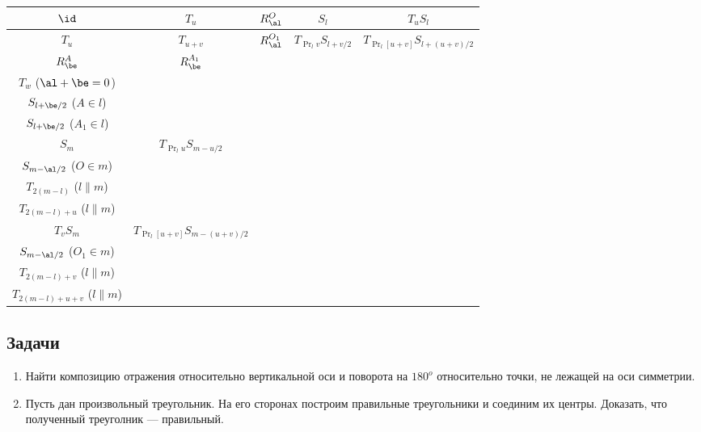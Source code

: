 \begin{enumerate}
\renewcommand{\arraystretch}{1.8}\renewcommand{\tabcolsep}{1mm}
\begin{center}\tiny
\begin{tabular}{c|c|c|c|c|}
$\id$  &  $T_u$      &   $R_\al^O$   &   $S_l$   & $T_uS_l$  \\
\hline
$T_u$  &  $T_{u+v}$  &   $R_\al^{O_1}$ & $T_{\Pr_lv}S_{l+v/2}$ & $T_{\Pr_l[u+v]}S_{l+(u+v)/2}$ \\ \hline 
$R_\be^A$ & $R_\be^{A_1}$ & \specialcell{$R_{\al+\be}^C$ ($\al+\be\ne 0$) \\ $T_w$ ($\al+\be=0$)} & \specialcell{$T_wS_{l+\be/2}$ ($A\notin l$) \\ $S_{l+\be/2}$ ($A\in l$)} & \specialcell{$T_wS_{l+\be/2}$ ($A_1\notin l$) \\ $S_{l+\be/2}$ ($A_1\in l$)} \\ \hline 
$S_m$ & $T_{\Pr_lu}S_{m-u/2} $ & \specialcell{$T_wS_{m-\al/2}$ ($O\notin m$) \\ $S_{m-\al/2}$ ($O\in m$)} &
\specialcell{$R_{2\angle lm}^{l\cap m}$ ($l\not\parallel m$) \\ $T_{2(m-l)}$ ($l\parallel m$)} & 
\specialcell{$R_{2\angle lm}^O$ ($l\not\parallel m$) \\ $T_{2(m-l)+u}$ ($l\parallel m$)} \\ \hline 
$T_vS_m$ & $T_{\Pr_l[u+v]}S_{m-(u+v)/2}$ & \specialcell{$T_wS_{m-\al/2}$ ($O_1\notin m$) \\ $S_{m-\al/2}$ ($O_1\in m$)} &
\specialcell{$R_{2\angle lm}^O$ ($l\not\parallel m$) \\ $T_{2(m-l)+v}$ ($l\parallel m$)} &
\specialcell{$R_{2\angle lm}^O$ ($l\not\parallel m$) \\ $T_{2(m-l)+u+v}$ ($l\parallel m$)} \\ \hline
\end{tabular}
\end{center}

\end{enumerate}


\subsection*{Задачи}
\begin{enumerate}
\item Найти композицию отражения относительно вертикальной оси и поворота на $180^o$ относительно точки, не лежащей на оси симметрии.
\item Пусть дан произвольный треугольник. На его сторонах построим правильные треугольники и соединим их центры. Доказать, что полученный треуголник --- правильный.
\end{enumerate}



